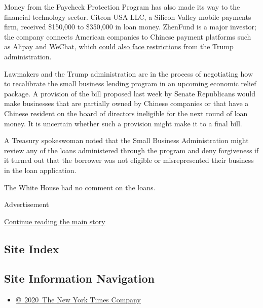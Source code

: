 Money from the Paycheck Protection Program has also made its way to the
financial technology sector. Citcon USA LLC, a Silicon Valley mobile
payments firm, received \$150,000 to \$350,000 in loan money. ZhenFund
is a major investor; the company connects American companies to Chinese
payment platforms such as Alipay and WeChat, which
\href{https://www.nytimes3xbfgragh.onion/2020/07/15/technology/tiktok-washington-lobbyist.html}{could
also face restrictions} from the Trump administration.

Lawmakers and the Trump administration are in the process of negotiating
how to recalibrate the small business lending program in an upcoming
economic relief package. A provision of the bill proposed last week by
Senate Republicans would make businesses that are partially owned by
Chinese companies or that have a Chinese resident on the board of
directors ineligible for the next round of loan money. It is uncertain
whether such a provision might make it to a final bill.

A Treasury spokeswoman noted that the Small Business Administration
might review any of the loans administered through the program and deny
forgiveness if it turned out that the borrower was not eligible or
misrepresented their business in the loan application.

The White House had no comment on the loans.

Advertisement

\protect\hyperlink{after-bottom}{Continue reading the main story}

\hypertarget{site-index}{%
\subsection{Site Index}\label{site-index}}

\hypertarget{site-information-navigation}{%
\subsection{Site Information
Navigation}\label{site-information-navigation}}

\begin{itemize}
\tightlist
\item
  \href{https://help.nytimes3xbfgragh.onion/hc/en-us/articles/115014792127-Copyright-notice}{©~2020~The
  New York Times Company}
\end{itemize}

